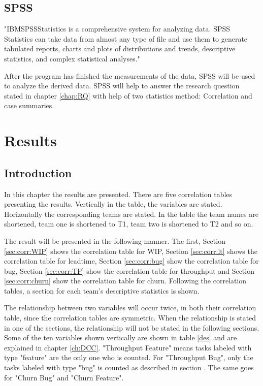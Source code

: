 \documentclass[UKenglish]{ifimaster}  %
\begin{document}
\section{SPSS}
\label{sec:SPSS}
"IBM\circledR  SPSS\circledR Statistics is a comprehensive system for analyzing data. SPSS Statistics can take data from almost any type of file and use them to generate tabulated reports, charts and plots of distributions and trends, descriptive statistics, and complex statistical analyses." \parencite{IBM}

After the program has finished the measurements of the data, SPSS will be used to analyze the derived data. SPSS will help to answer the research question stated in chapter \ref{chap:RQ} with help of two statistics method: Correlation and case summaries. 


\chapter{Results}                     %
\label{ch:res}
\section{Introduction}
In this chapter the results are presented. There are five correlation tables presenting the results. Vertically in the table, the variables are stated. Horizontally the corresponding teams are stated. In the table the team names are shortened, team one is shortened to T1, team two is shortened to T2 and so on. 

The result will be presented in the following manner. The first, Section \ref{sec:corr:WIP} shows the correlation table for WIP, Section \ref{sec:corr:lt} shows the correlation table for leadtime, Section \ref{sec:corr:bug} show the correlation table for bug, Section \ref {sec:corr:TP} show the correlation table for throughput and Section \ref {sec:corr:churn} show the correlation table for churn. Following the correlation tables, a section for each team's descriptive statistics  is shown.  


The relationship between two variables will occur twice, in both their correlation table, since the correlation tables are symmetric. When the relationship is stated in one of the sections, the relationship will not be stated in the following sections. Some of the ten variables shown vertically are shown in table \ref{des} and are explained in chapter \ref{ch:DCC}. "Throughput Feature" means tasks labeled with type "feature" are the only one who is counted. For "Throughput Bug", only the tasks labeled with type "bug" is counted as described in section . The same goes for "Churn Bug" and "Churn Feature". 
\end{document}

